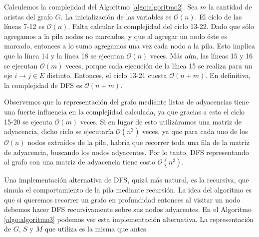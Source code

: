 Calculemos la complejidad del Algoritmo \ref{algo:algoritmo2}. Sea $m$ la cantidad de aristas del grafo $G$. La inicialización de las variables es $\mathcal{O}(n)$. El ciclo de las líneas 7-12 es $\mathcal{O}(n)$. Falta calcular la complejidad del ciclo 13-22. Dado que sólo agregamos a la pila nodos no marcados, y que al agregar un nodo éste es marcado, entonces a lo sumo agregamos una vez cada nodo a la pila. Esto implica que la línea 14 y la línea 18 se ejecutan $\mathcal{O}(n)$ veces. Más aún, las líneas 15 y 16 se ejecutan $\mathcal{O}(m)$ veces, porque cada ejecución de la línea 15 se realiza para un eje $i \to j \in E$ distinto. Entonces, el ciclo 13-21 cuesta $\mathcal{O}(n + m)$. En definitiva, la complejidad de DFS es $\mathcal{O}(n + m)$. 

Observemos que la representación del grafo mediante listas de adyacencias tiene una fuerte influencia en la complejidad calculada, ya que gracias a esto el ciclo 15-20 se ejecuta $\mathcal{O}(m)$ veces. Si en lugar de esto utilizáramos una matriz de adyacencia, dicho ciclo se ejecutaría $\mathcal{O}(n^2)$ veces, ya que para cada uno de los $\mathcal{O}(n)$ nodos extraídos de la pila, habría que recorrer toda una fila de la matriz de adyacencia, buscando los nodos adyacentes. Por lo tanto, DFS representando al grafo con una matriz de adyacencia tiene costo $\mathcal{O}(n^2)$. 

Una implementación alternativa de DFS, quizá más natural, es la recursiva, que simula el comportamiento de la pila mediante recursión. La idea del algoritmo es que si queremos recorrer un grafo en profundidad entonces al visitar un nodo debemos hacer DFS recursivamente sobre sus nodos adyacentes. En el Algoritmo \ref{algo:algoritmo3} podemos ver esta implementación alternativa. La representación de $G$, $S$ y $M$ que utiliza es la misma que antes.

\begin{algorithm}
	\dontprintsemicolon
 	\BlankLine
\caption{$\textsc{Recursive-DFS}$}
\label{algo:algoritmo3}
\end{algorithm}

\begin{algorithm}
	\dontprintsemicolon
	\Output{-}
 	\BlankLine
\caption{$\textsc{DFS-Visit}$}
\label{algo:algoritmo4}
\end{algorithm}

